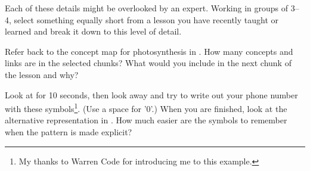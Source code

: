 Each of these details might be overlooked by an expert.
Working in groups of 3--4,
select something equally short from a lesson you have recently taught or learned
and break it down to this level of detail.


Refer back to the concept map for photosynthesis in .
How many concepts and links are in the selected chunks?
What would you include in the next chunk of the lesson and why?


Look at  for 10 seconds,
then look away and try to write out your phone number with these symbols\footnote{
  My thanks to Warren Code for introducing me to this example.
}.
(Use a space for '0'.)
When you are finished,
look at the alternative representation in .
How much easier are the symbols to remember when the pattern is made explicit?

